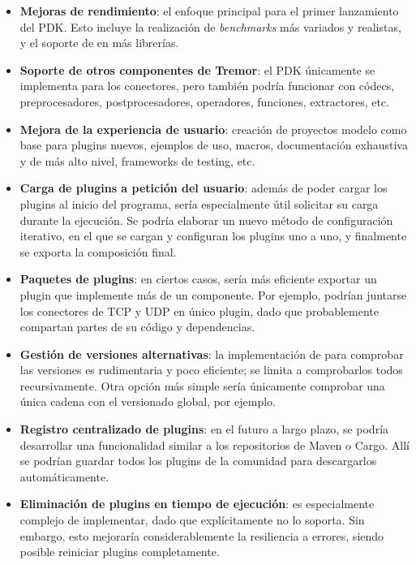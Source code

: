 \begin{itemize}
    \item \textbf{Mejoras de rendimiento}: el enfoque principal para el primer
        lanzamiento del PDK. Esto incluye la realización de \emph{benchmarks}
        más variados y realistas, y el soporte de \abistable en más librerías.

    \item \textbf{Soporte de otros componentes de Tremor}: el PDK únicamente se
        implementa para los conectores, pero también podría funcionar con
        códecs, preprocesadores, postprocesadores, operadores, funciones,
        extractores, etc.

    \item \textbf{Mejora de la experiencia de usuario}: creación de proyectos
        modelo como base para plugins nuevos, ejemplos de uso, macros,
        documentación exhaustiva y de más alto nivel, frameworks de testing,
        etc.

    \item \textbf{Carga de plugins a petición del usuario}: además de poder
        cargar los plugins al inicio del programa, sería especialmente útil
        solicitar su carga durante la ejecución. Se podría elaborar un nuevo
        método de configuración iterativo, en el que se cargan y configuran los
        plugins uno a uno, y finalmente se exporta la composición final.

    \item \textbf{Paquetes de plugins}: en ciertos casos, sería más eficiente
        exportar un plugin que implemente más de un componente. Por ejemplo,
        podrían juntarse los conectores de TCP y UDP en único plugin, dado que
        probablemente compartan partes de su código y dependencias.

    \item \textbf{Gestión de versiones alternativas}: la implementación de
        \abistable para comprobar las versiones es rudimentaria y poco
        eficiente; se limita a comprobarlos todos recursivamente. Otra opción
        más simple sería únicamente comprobar una única cadena con el versionado
        global, por ejemplo.

    \item \textbf{Registro centralizado de plugins}: en el futuro a largo plazo,
        se podría desarrollar una funcionalidad similar a los repositorios de
        Maven o Cargo. Allí se podrían guardar todos los plugins de la comunidad
        para descargarlos automáticamente.

    \item \textbf{Eliminación de plugins en tiempo de ejecución}: es
        especialmente complejo de implementar, dado que \abistable
        explícitamente no lo soporta. Sin embargo, esto mejoraría
        considerablemente la resiliencia a errores, siendo posible reiniciar
        plugins completamente.

\end{itemize}

